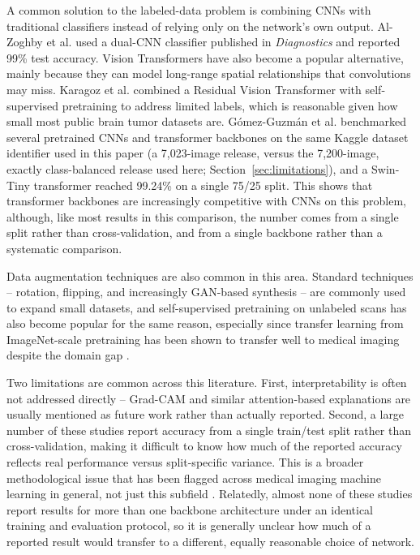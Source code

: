 \documentclass[11pt]{article}
\begin{document}
A common solution to the labeled-data problem is combining CNNs with traditional classifiers instead of relying only on the network's own output. Al-Zoghby et al. \cite{alzoghby2023dual} used a dual-CNN classifier published in \emph{Diagnostics} and reported 99\% test accuracy. Vision Transformers \cite{dosovitskiy2021vit} have also become a popular alternative, mainly because they can model long-range spatial relationships that convolutions may miss. Karagoz et al. \cite{karagoz2024resvit} combined a Residual Vision Transformer with self-supervised pretraining to address limited labels, which is reasonable given how small most public brain tumor datasets are. G\'omez-Guzm\'an et al. \cite{gomezguzman2025swin} benchmarked several pretrained CNNs and transformer backbones on the same Kaggle dataset identifier used in this paper (a 7,023-image release, versus the 7,200-image, exactly class-balanced release used here; Section~\ref{sec:limitations}), and a Swin-Tiny transformer reached 99.24\% on a single 75/25 split. This shows that transformer backbones are increasingly competitive with CNNs on this problem, although, like most results in this comparison, the number comes from a single split rather than cross-validation, and from a single backbone rather than a systematic comparison.

Data augmentation techniques are also common in this area. Standard techniques -- rotation, flipping, and increasingly GAN-based synthesis \cite{goodfellow2014gan} -- are commonly used to expand small datasets, and self-supervised pretraining on unlabeled scans has also become popular for the same reason, especially since transfer learning from ImageNet-scale pretraining has been shown to transfer well to medical imaging despite the domain gap \cite{morid2021transfer}.

Two limitations are common across this literature. First, interpretability is often not addressed directly -- Grad-CAM and similar attention-based explanations are usually mentioned as future work rather than actually reported. Second, a large number of these studies report accuracy from a single train/test split rather than cross-validation, making it difficult to know how much of the reported accuracy reflects real performance versus split-specific variance. This is a broader methodological issue that has been flagged across medical imaging machine learning in general, not just this subfield \cite{varoquaux2022leakage}. Relatedly, almost none of these studies report results for more than one backbone architecture under an identical training and evaluation protocol, so it is generally unclear how much of a reported result would transfer to a different, equally reasonable choice of network.
\end{document}
